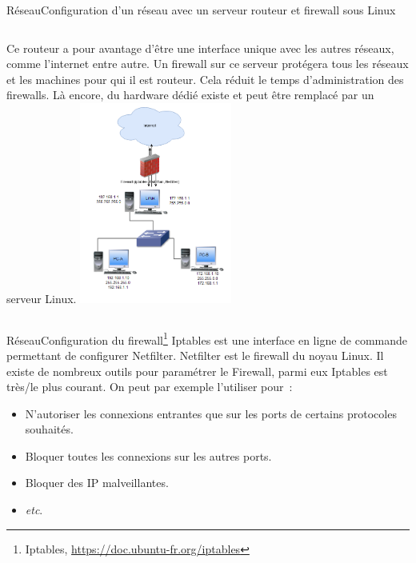 \documentclass{beamer}
\begin{document}
    \begin{frame}{Réseau}{Configuration d'un réseau avec un serveur routeur et firewall sous Linux}
        \begin{columns}
            Ce routeur a pour avantage d'être une interface unique avec les autres réseaux, comme l'internet entre autre.
            \bigbreak
            Un firewall sur ce serveur protégera tous les réseaux et les machines pour qui il est routeur.
            \bigbreak
            Cela réduit le temps d'administration des firewalls.
            \bigbreak
            Là encore, du hardware dédié existe et peut être remplacé par un serveur Linux.
            \centering
            \includegraphics[width=5cm]{image/router-and-firewall.drawio}
        \end{columns}
    \end{frame}

    \begin{frame}{Réseau}{Configuration du firewall\footnote{\label{iptables}Iptables, \url{https://doc.ubuntu-fr.org/iptables}}}
        Iptables est une interface en ligne de commande permettant de configurer Netfilter.
        Netfilter est le firewall du noyau Linux.
        \bigbreak
        Il existe de nombreux outils pour paramétrer le Firewall, parmi eux Iptables est très/le plus courant.
        \bigbreak
        On peut par exemple l'utiliser pour~:
        \begin{itemize}
            \item N'autoriser les connexions entrantes que sur les ports de certains protocoles souhaités.
            \item Bloquer toutes les connexions sur les autres ports.
            \item Bloquer des IP malveillantes.
            \item \textit{etc}.
        \end{itemize}
    \end{frame}
\end{document}
